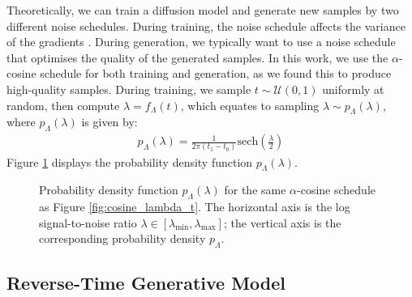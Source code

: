 \documentclass[ oneside,%
                    author={George Herbert},
                    degree={MSci},
                     title={Diffusion Models for Time-Evolving Precipitation Fields},
                  subtitle={}]{dissertation}
\begin{document}
Theoretically, we can train a diffusion model and generate new samples by two different noise schedules. During training, the noise schedule affects the variance of the gradients \cite{Understanding_Diffusion_Objective_Kingma}. During generation, we typically want to use a noise schedule that optimises the quality of the generated samples. In this work, we use the $\alpha$-cosine schedule for both training and generation, as we found this to produce high-quality samples. During training, we sample $t\sim\mathcal{U}(0,1)$ uniformly at random, then compute $\lambda=f_\Lambda(t)$, which equates to sampling $\lambda\sim p_\Lambda(\lambda)$, where $p_\Lambda(\lambda)$ is given by:
\begin{align}
      p_\Lambda(\lambda)=\frac{1}{2\pi(t_1-t_0)}\mathrm{sech}\left(\frac{\lambda}{2}\right)
\end{align}
Figure \ref{fig:p_lambda} displays the probability density function $p_\Lambda(\lambda)$.
\begin{figure}[htbp]
      \centering
      \caption{Probability density function $p_\Lambda(\lambda)$ for the same $\alpha$-cosine schedule as Figure \ref{fig:cosine_lambda_t}. The horizontal axis is the log signal-to-noise ratio $\lambda\in[\lambda_{\min}, \lambda_{\max}]$; the vertical axis is the corresponding probability density $p_\Lambda$.}
      \label{fig:p_lambda}
\end{figure}

\subsection{Reverse-Time Generative Model}
\label{sec:background_diffusion_reverse}
\end{document}
